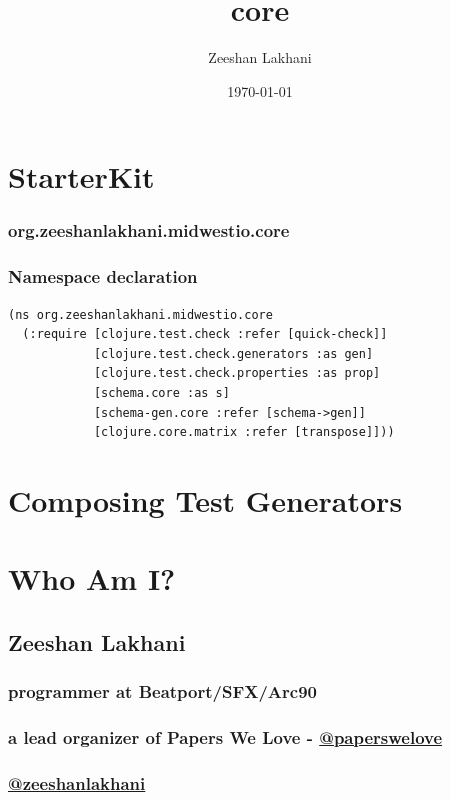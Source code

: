 \documentclass[11pt]{article}
\author{Zeeshan Lakhani}
\date{\today}
\title{core}
\begin{document}
\maketitle
\setcounter{tocdepth}{3}
\tableofcontents


\section{StarterKit}
\label{sec-1}
\subsubsection{org.zeeshanlakhani.midwestio.core}
\label{sec-1-0-1}
\subsubsection{Namespace declaration}
\label{sec-1-0-2}
\begin{verbatim}
(ns org.zeeshanlakhani.midwestio.core
  (:require [clojure.test.check :refer [quick-check]]
            [clojure.test.check.generators :as gen]
            [clojure.test.check.properties :as prop]
            [schema.core :as s]
            [schema-gen.core :refer [schema->gen]]
            [clojure.core.matrix :refer [transpose]]))
\end{verbatim}

\section{Composing Test Generators}
\label{sec-2}
\section{Who Am I?}
\label{sec-3}
\subsection{Zeeshan Lakhani}
\label{sec-3-1}
\subsubsection{programmer at Beatport/SFX/Arc90}
\label{sec-3-1-1}
\subsubsection{a lead organizer of Papers We Love - \href{https://twitter.com/papers_we_love}{@paperswelove}}
\label{sec-3-1-2}
\subsubsection{\href{https://twitter.com/zeeshanlakhani}{@zeeshanlakhani}}
\label{sec-3-1-3}
\end{document}
